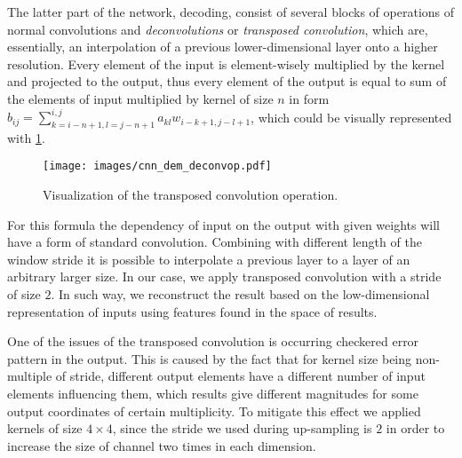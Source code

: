 The latter part of the network, decoding, consist of several blocks of operations of normal convolutions and \textit{deconvolutions} or \textit{transposed convolution}, which are, essentially, an interpolation of a previous lower-dimensional layer onto a higher resolution.
Every element of the input is element-wisely multiplied by the kernel and projected to the output, thus every element of the output is equal to sum of the elements of input multiplied by kernel of size $n$ in form $b_{ij} = \sum_{k=i-n+1,l=j-n+1}^{i,j} a_{kl}w_{i-k+1,j-l+1}$, which could be visually represented with \ref{fig:deconv_op}.
\begin{figure}
	\centering
	\texttt{[image: images/cnn\_dem\_deconvop.pdf]}
	\label{fig:deconv_op}
	\caption{Visualization of the transposed convolution operation.}
\end{figure}
For this formula the dependency of input on the output with given weights will have a form of standard convolution.
Combining with different length of the window stride it is possible to interpolate a previous layer to a layer of an arbitrary larger size. 
In our case, we apply transposed convolution with a stride of size $2$.
In such way, we reconstruct the result based on the low-dimensional representation of inputs using features found in the space of results.
\medskip

One of the issues of the transposed convolution is occurring checkered error pattern in the output.
This is caused by the fact that for kernel size being non-multiple of stride, different output elements have a different number of input elements influencing them, which results give different magnitudes for some output coordinates of certain multiplicity.
To mitigate this effect we applied kernels of size $4 \times 4$, since the stride we used during up-sampling is $2$ in order to increase the size of channel two times in each dimension.
\medskip

